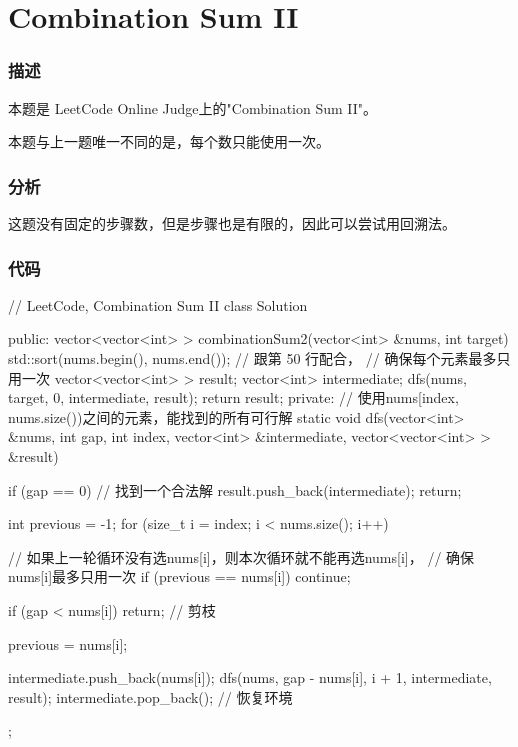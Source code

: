 \section{Combination Sum II} %

\subsubsection{描述}
本题是 LeetCode Online Judge上的"Combination Sum II"。

本题与上一题唯一不同的是，每个数只能使用一次。

\subsubsection{分析}
这题没有固定的步骤数，但是步骤也是有限的，因此可以尝试用回溯法。

\subsubsection{代码}
\begin{Codex}[label=combination_sum2.cpp]
// LeetCode, Combination Sum II
class Solution {
public:
    vector<vector<int> > combinationSum2(vector<int> &nums, int target) {
        std::sort(nums.begin(), nums.end()); // 跟第 50 行配合，
                                             // 确保每个元素最多只用一次
        vector<vector<int> > result;
        vector<int> intermediate;
        dfs(nums, target, 0, intermediate, result);
        return result;
    }
private:
    // 使用nums[index, nums.size())之间的元素，能找到的所有可行解
    static void dfs(vector<int> &nums, int gap, int index,
            vector<int> &intermediate, vector<vector<int> > &result) {
        if (gap == 0) {  //  找到一个合法解
            result.push_back(intermediate);
            return;
        }

        int previous = -1;
        for (size_t i = index; i < nums.size(); i++) {
            // 如果上一轮循环没有选nums[i]，则本次循环就不能再选nums[i]，
            // 确保nums[i]最多只用一次
            if (previous == nums[i]) continue;

            if (gap < nums[i]) return;  // 剪枝

            previous = nums[i];

            intermediate.push_back(nums[i]);
            dfs(nums, gap - nums[i], i + 1, intermediate, result);
            intermediate.pop_back();  // 恢复环境
        }
    }
};
\end{Codex}